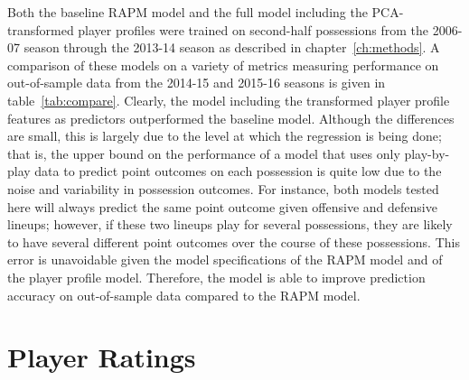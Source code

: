 Both the baseline RAPM model and the full model including the PCA-transformed player
profiles were trained on second-half possessions from the 2006-07 season through the
2013-14 season as described in chapter~\ref{ch:methods}. A comparison of these
models on a variety of metrics measuring performance on out-of-sample data from the
2014-15 and 2015-16 seasons is given in table~\ref{tab:compare}. Clearly, the model
including the transformed player profile features as predictors outperformed the
baseline model. Although the differences are small, this is largely due to the level
at which the regression is being done; that is, the upper bound on the performance
of a model that uses only play-by-play data to predict point outcomes on each
possession is quite low due to the noise and variability in possession outcomes. For
instance, both models tested here will always predict the same point outcome given
offensive and defensive lineups; however, if these two lineups play for several
possessions, they are likely to have several different point outcomes over the
course of these possessions. This error is unavoidable given the model
specifications of the RAPM model and of the player profile model. Therefore, the
model is able to improve prediction accuracy on out-of-sample data compared to the
RAPM model.

\begin{table}
    \centering
    \noindent{}
    \caption{Comparing the out-of-sample performance of the regression on player
    profile data to the baseline RAPM model.}
    \label{tab:compare}
\end{table}

\section{Player Ratings}

